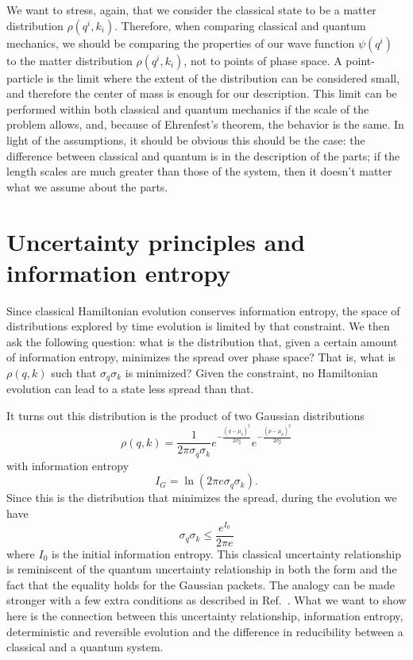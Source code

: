 \documentclass{ws-ijqi}
\begin{document}
We want to stress, again, that we consider the classical state to be a matter distribution $\rho(q^i, k_i)$. Therefore, when comparing classical and quantum mechanics, we should be comparing the properties of our wave function $\psi(q^i)$ to the matter distribution $\rho(q^i, k_i)$, not to points of phase space. A point-particle is the limit where the extent of the distribution can be considered small, and therefore the center of mass is enough for our description. This limit can be performed within both classical and quantum mechanics if the scale of the problem allows, and, because of Ehrenfest's theorem, the behavior is the same. In light of the assumptions, it should be obvious this should be the case: the difference between classical and quantum is in the description of the parts; if the length scales are much greater than those of the system, then it doesn't matter what we assume about the parts.

\section{Uncertainty principles and information entropy}

Since classical Hamiltonian evolution conserves information entropy, the space of distributions explored by time evolution is limited by that constraint. We then ask the following question: what is the distribution that, given a certain amount of information entropy, minimizes the spread over phase space? That is, what is $\rho(q, k)$ such that $\sigma_q\sigma_k$ is minimized? Given the constraint, no Hamiltonian evolution can lead to a state less spread than that.

It turns out this distribution is the product of two Gaussian distributions
\begin{equation}
\rho(q,k) = \frac{1}{2\pi\sigma_q\sigma_k} e^{- \frac{(q - \mu_q)^2}{2 \sigma_q^2}} e^{- \frac{(p - \mu_p)^2}{2 \sigma_p^2}}
\end{equation}
with information entropy
\begin{equation}
I_G = \ln (2 \pi e \sigma_q \sigma_k).
\end{equation}
Since this is the distribution that minimizes the spread, during the evolution we have
\begin{equation}
\sigma_q \sigma_k \leq \frac{e^{I_0}}{2 \pi e}
\end{equation}
where $I_0$ is the initial information entropy. This classical uncertainty relationship is reminiscent of the quantum uncertainty relationship in both the form and the fact that the equality holds for the Gaussian packets. The analogy can be made stronger with a few extra conditions as described in Ref.~. What we want to show here is the connection between this uncertainty relationship, information entropy, deterministic and reversible evolution and the difference in reducibility between a classical and a quantum system.
\end{document}
